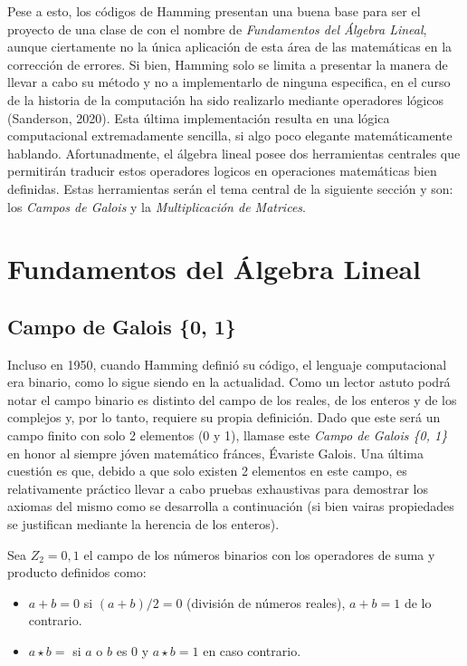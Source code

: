 \documentclass{article}
\begin{document}
Pese a esto, los códigos de Hamming presentan una buena base para ser el proyecto de una clase de con el nombre de \textit{Fundamentos del Álgebra Lineal}, aunque ciertamente no la única aplicación de esta área de las matemáticas en la corrección de errores. Si bien, Hamming solo se limita a presentar la manera de llevar a cabo su método y no a implementarlo de ninguna especifica, en el curso de la historia de la computación ha sido realizarlo mediante operadores lógicos (Sanderson, 2020). Esta última implementación resulta en una lógica computacional extremadamente sencilla, si algo poco elegante matemáticamente hablando. Afortunadmente, el álgebra lineal posee dos herramientas centrales que permitirán traducir estos operadores logicos en operaciones matemáticas bien definidas. Estas herramientas serán el tema central de la siguiente sección y son: los \textit{Campos de Galois} y la \textit{Multiplicación de Matrices}.

\section{Fundamentos del Álgebra Lineal}

\subsection{Campo de Galois \{0, 1\}}

Incluso en 1950, cuando Hamming definió su código, el lenguaje computacional era binario, como lo sigue siendo en la actualidad. Como un lector astuto podrá notar el campo binario es distinto del campo de los reales, de los enteros y de los complejos y, por lo tanto, requiere su propia definición. Dado que este será un campo finito con solo 2 elementos (0 y 1), llamase este \textit{Campo de Galois \{0, 1\}} en honor al siempre jóven matemático fránces, Évariste Galois. Una última cuestión es que, debido a que solo existen 2 elementos en este campo, es relativamente práctico llevar a cabo pruebas exhaustivas para demostrar los axiomas del mismo como se desarrolla a continuación (si bien vairas propiedades se justifican mediante la herencia de los enteros).

Sea $Z_2 = {0, 1}$ el campo de los números binarios con los operadores de suma y producto definidos como:
\begin{itemize}
    \item $a + b = 0$ si $(a + b)/2 = 0$ (división de números reales), $a + b = 1$ de lo contrario.
    \item $a \star b = $ si $a$ o $b$ es $0$ y $a \star b = 1$ en caso contrario.
\end{itemize}
\end{document}
